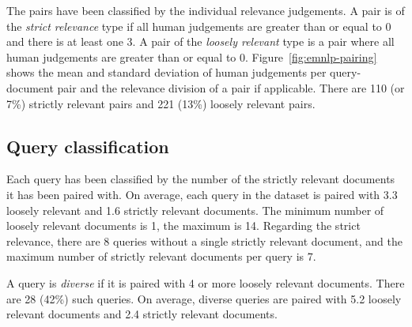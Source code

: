 The pairs have been classified by the individual relevance judgements. A pair is of the \textit{strict relevance} type if all human judgements are greater than or equal to 0 and there is at least one 3. A pair of the \textit{loosely   relevant} type is a pair where all human judgements are greater than or equal to 0. Figure~\ref{fig:emnlp-pairing} shows the mean and standard deviation of human judgements per query-document pair and the relevance division of a pair if applicable. There are 110 (or 7\%) strictly relevant pairs and 221 (13\%) loosely relevant pairs.

\subsection{Query classification}

Each query has been classified by the number of the strictly relevant documents it has been paired with. On average, each query in the dataset is paired with 3.3 loosely relevant and 1.6 strictly relevant documents. The minimum number of loosely relevant documents is 1, the maximum is 14. Regarding the strict relevance, there are 8 queries without a single strictly relevant document, and the maximum number of strictly relevant documents per query is 7.

A query is \textit{diverse} if it is paired with 4 or more loosely relevant documents. There are 28 (42\%) such queries. On average, diverse queries are paired with 5.2 loosely relevant documents and 2.4 strictly relevant documents.

